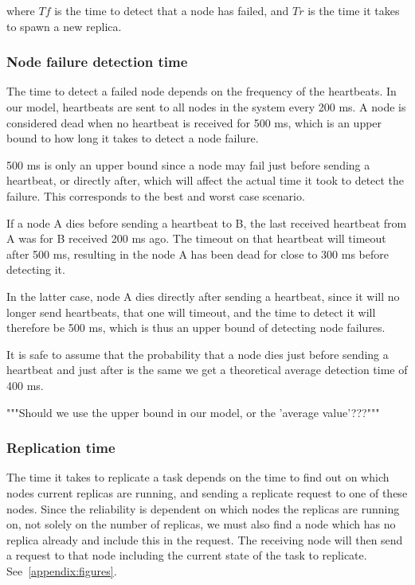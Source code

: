 \documentclass{cslthse-msc}
\begin{document}
where $Tf$ is the time to detect that a node has failed, and $Tr$ is the time it takes to spawn a new replica.

\subsubsection{Node failure detection time} \label{sec:node_failure_detection_time}
The time to detect a failed node depends on the frequency of the heartbeats. In our model, heartbeats are sent to all nodes in the system every 200 ms. A node is considered dead when no heartbeat is received for 500 ms, which is an upper bound to how long it takes to detect a node failure.

500 ms is only an upper bound since a node may fail just before sending a heartbeat, or directly after, which will affect the actual time it took to detect the failure. This corresponds to the best and worst case scenario. 

If a node A dies before sending a heartbeat to B, the last received heartbeat from A was for B received 200 ms ago. The timeout on that heartbeat will timeout after 500 ms, resulting in the node A has been dead for close to 300 ms before detecting it. 

In the latter case, node A dies directly after sending a heartbeat, since it will no longer send heartbeats, that one will timeout, and the time to detect it will therefore be 500 ms, which is thus an upper bound of detecting node failures.

It is safe to assume that the probability that a node dies just before sending a heartbeat and just after is the same we get a theoretical average detection time of 400 ms.

"""Should we use the upper bound in our model, or the 'average value'???"""

\subsubsection{Replication time} \label{sec:replication_time}
The time it takes to replicate a task depends on the time to find out on which nodes current replicas are running, and sending a replicate request to one of these nodes. Since the reliability is dependent on which nodes the replicas are running on, not solely on the number of replicas, we must also find a node which has no replica already and include this in the request. The receiving node will then send a request to that node including the current state of the task to replicate. See~\cref{appendix:figures}.
\end{document}
